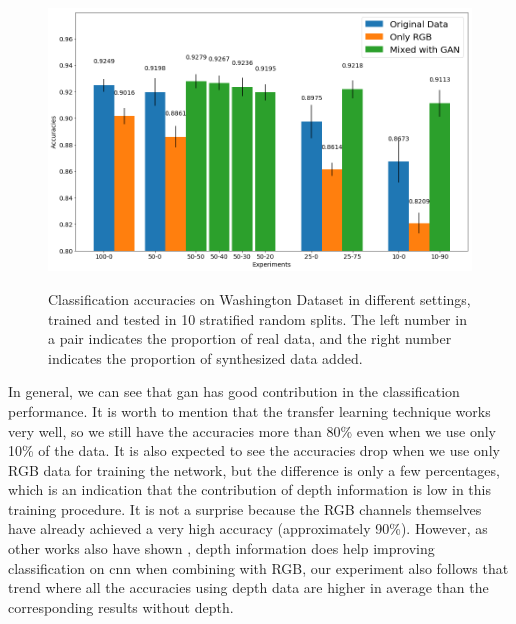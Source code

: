 \begin{figure}[h]
	\caption{Classification accuracies on Washington Dataset in different settings,
		trained and tested in 10 stratified random splits. The left number in a pair indicates
		the proportion of real data, and the right number indicates the proportion of synthesized
	data added.}
	\centering
	\includegraphics[width=\textwidth]{img/eitel_accuracies}
	\label{fig:eitel_accuracies}
\end{figure}

In general, we can see that \acrshort{gan} has good contribution in the classification
performance. It is worth to mention that the transfer learning technique works very well,
so we still have the accuracies more than 80\% even when we use only 10\% of the data. It
is also expected to see the accuracies drop when we use only RGB data for training the
network, but the difference is only a few percentages, which is an indication that the
contribution of depth information is low in this training procedure. It is not a surprise
because the RGB channels themselves have already achieved a very high accuracy
(approximately 90\%). However, as other works also have shown \cite{eitel, alexandre},
depth information does help improving classification on \acrfull{cnn} when combining with
RGB, our experiment also follows that trend where all the accuracies using depth data are
higher in average than the corresponding results without depth.

